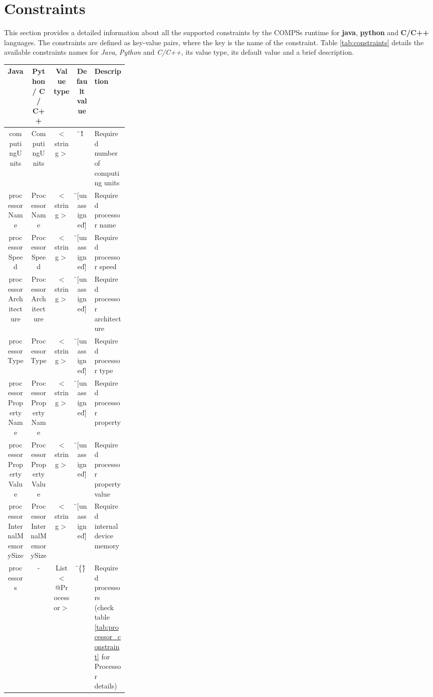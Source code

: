 \section{Constraints}
\label{sec:Constraints}

This section provides a detailed information about all the supported constraints by the COMPSs runtime for 
\textbf{java}, \textbf{python} and \textbf{C/C++} languages. The constraints are defined as key-value pairs,
where the key is the name of the constraint. Table \ref{tab:constraints} details the available constraints names 
for \textit{Java}, \textit{Python} and \textit{C/C++}, its value type, its default value and a brief description.

\newpage

\begin{landscape}
\bgroup
  \def\arraystretch{1.3}%
  \begin{table}[]
  \centering
  \begin{tabular}{ | c | c | c | c | p{0.28\linewidth} | }
  \hline
  \textbf{Java} 		& \textbf{Python / C / C++}	& \textbf{Value type}	& \textbf{Default value}& \textbf{Description} \\ \hline
  computingUnits 		& ComputingUnits 		& $<$string$>$ 		& \"{}1\" 		& Required number of computing units \\ \hline
  processorName 		& ProcessorName 		& $<$string$>$ 		& \"{}[unassigned]\" 	& Required processor name \\ \hline
  processorSpeed 		& ProcessorSpeed 		& $<$string$>$ 		& \"{}[unassigned]\" 	& Required processor speed \\ \hline
  processorArchitecture 	& ProcessorArchitecture 	& $<$string$>$ 		& \"{}[unassigned]\" 	& Required processor architecture \\ \hline
  processorType			& ProcessorType		 	& $<$string$>$ 		& \"{}[unassigned]\" 	& Required processor type \\ \hline
  processorPropertyName		& ProcessorPropertyName 	& $<$string$>$ 		& \"{}[unassigned]\" 	& Required processor property \\ \hline
  processorPropertyValue	& ProcessorPropertyValue 	& $<$string$>$ 		& \"{}[unassigned]\" 	& Required processor property value \\ \hline
  processorInternalMemorySize 	& ProcessorInternalMemorySize 	& $<$string$>$ 		& \"{}[unassigned]\" 	& Required internal device memory \\ \hline
  processors 			& - 				& List$<$@Processor$>$  & \"{}\{\}\" 		& Required processors (check table \ref{tab:processor_constraint} for Processor details) \\ \hline

\end{tabular}
\end{table}
\end{landscape}
